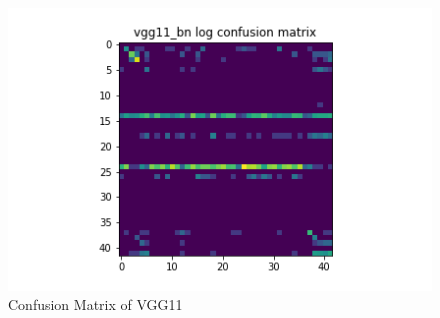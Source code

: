 \begin{figure}[H]
\begin{minipage}[b]{.5\linewidth}
  \end{minipage}
  \hfill
  \begin{minipage}[b]{.5\linewidth}
    \centering
    \includegraphics[width=1.2\textwidth]{figs/conf_matrix/vgg11_bn_log_conf.png}
  \end{minipage}
  \caption{Confusion Matrix of VGG11}
  \label{fig:vgg11_conf}
\end{figure}

